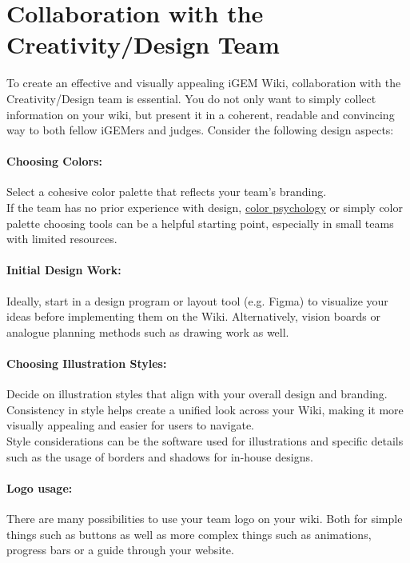  \section{Collaboration with the Creativity/Design Team } \label{sec:2.1}
    To create an effective and visually appealing iGEM Wiki, collaboration with the Creativity/Design team is essential. You do not only want to simply collect information on your wiki, but present it in a coherent, readable and convincing way to both fellow iGEMers and judges. Consider the following design aspects:

    \paragraph{Choosing Colors:} Select a cohesive color palette that reflects your team’s branding.\\
    If the team has no prior experience with design, \href{https://en.wikipedia.org/wiki/Color_psychology}{color psychology}\cite{colorpsychology} or simply color palette choosing tools can be a helpful starting point, especially in small teams with limited resources.
    \paragraph{Initial Design Work:} Ideally, start in a design program or layout tool (e.g. Figma) to visualize your ideas before implementing them on the Wiki. Alternatively, vision boards or analogue planning methods such as drawing work as well.
    \paragraph{Choosing Illustration Styles:} Decide on illustration styles that align with your overall design and branding. Consistency in style helps create a unified look across your Wiki, making it more visually appealing and easier for users to navigate. \\
    Style considerations can be the software used for illustrations and specific details such as the usage of borders and shadows for in-house designs.
    \paragraph{Logo usage:} There are many possibilities to use your team logo on your wiki. Both for simple things such as buttons as well as more complex things such as animations, progress bars or a guide through your website.

